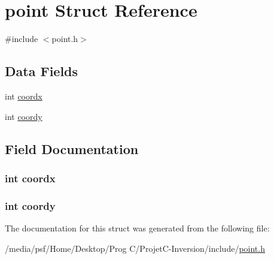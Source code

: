 \hypertarget{structpoint}{\section{point Struct Reference}
\label{structpoint}
}


{\ttfamily \#include $<$point.\-h$>$}

\subsection*{Data Fields}
\begin{DoxyCompactItemize}
\item 
int \hyperlink{structpoint_aca902e5f4bbe7da14f4a3919232b7ec2}{coordx}
\item 
int \hyperlink{structpoint_adeb244112fe692816d2b167efcaf3070}{coordy}
\end{DoxyCompactItemize}


\subsection{Field Documentation}
\hypertarget{structpoint_aca902e5f4bbe7da14f4a3919232b7ec2}{
\subsubsection[{coordx}]{\setlength{\rightskip}{0pt plus 5cm}int coordx}}\label{structpoint_aca902e5f4bbe7da14f4a3919232b7ec2}
\hypertarget{structpoint_adeb244112fe692816d2b167efcaf3070}{
\subsubsection[{coordy}]{\setlength{\rightskip}{0pt plus 5cm}int coordy}}\label{structpoint_adeb244112fe692816d2b167efcaf3070}


The documentation for this struct was generated from the following file\-:\begin{DoxyCompactItemize}
\item 
/media/psf/\-Home/\-Desktop/\-Prog C/\-Projet\-C-\/\-Inversion/include/\hyperlink{point_8h}{point.\-h}\end{DoxyCompactItemize}
